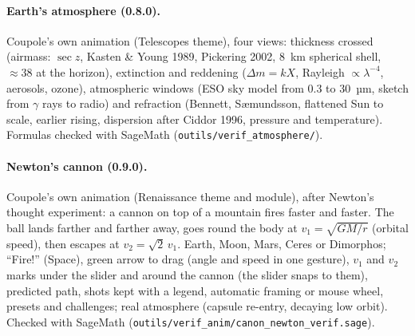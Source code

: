 \paragraph{Earth's atmosphere (0.8.0).} Coupole's own animation (Telescopes theme), four views: thickness crossed
(airmass: $\sec z$, Kasten \& Young 1989, Pickering 2002, 8~km spherical shell, $\approx 38$ at the horizon),
extinction and reddening ($\Delta m = kX$, Rayleigh $\propto \lambda^{-4}$, aerosols, ozone), atmospheric windows (ESO
sky model from 0.3 to 30~µm, sketch from $\gamma$ rays to radio) and refraction (Bennett, Sæmundsson, flattened Sun to
scale, earlier rising, dispersion after Ciddor 1996, pressure and temperature). Formulas checked with SageMath
(\texttt{outils/verif\_atmosphere/}).

\paragraph{Newton's cannon (0.9.0).} Coupole's own animation (Renaissance theme and module), after Newton's thought
experiment: a cannon on top of a mountain fires faster and faster. The ball lands farther and farther away, goes round
the body at $v_1=\sqrt{GM/r}$ (orbital speed), then escapes at $v_2=\sqrt{2}\,v_1$. Earth, Moon, Mars, Ceres or
Dimorphos; “Fire!” (Space), green arrow to drag (angle and speed in one gesture), $v_1$ and $v_2$ marks under the slider
and around the cannon (the slider snaps to them), predicted path, shots kept with a legend, automatic framing or mouse
wheel, presets and challenges; real atmosphere (capsule re-entry, decaying low orbit). Checked with SageMath
(\texttt{outils/verif\_anim/canon\_newton\_verif.sage}).

